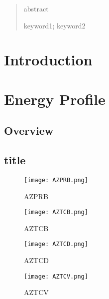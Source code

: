 \documentclass{mcmthesis}
\title{}
\newcommand{\rmnum}[1]{\romannumeral #1}
\begin{document}
\begin{abstract}
abstract
\begin{keywords}
keyword1; keyword2
\end{keywords}
\end{abstract}
\maketitle


\tableofcontents
\pagestyle{fancy} 
\rhead{\small\sffamily  \rmnum{\thepage}}
\newpage
\pagestyle{fancy}
\setcounter{page}{1}

\section{Introduction}

\section{Energy Profile}
\subsection{Overview}
\subsection{title}
\begin{figure}[H]
\begin{minipage}[htb]{0.5\textwidth}
\centering
\texttt{[image: AZPRB.png]}
\caption{AZPRB} \label{fig:AZPRB}
\end{minipage}
\begin{minipage}[htb]{0.5\textwidth}
\centering
\texttt{[image: AZTCB.png]}
\caption{AZTCB} \label{fig:AZTCB}
\end{minipage}
\end{figure}

\begin{figure}[H]
\begin{minipage}[htb]{0.5\textwidth}
\centering
\texttt{[image: AZTCD.png]}
\caption{AZTCD} \label{fig:AZTCD}
\end{minipage}
\begin{minipage}[htb]{0.5\textwidth}
\centering
\texttt{[image: AZTCV.png]}
\caption{AZTCV} \label{fig:AZTCV}
\end{minipage}
\end{figure}
\end{document}
